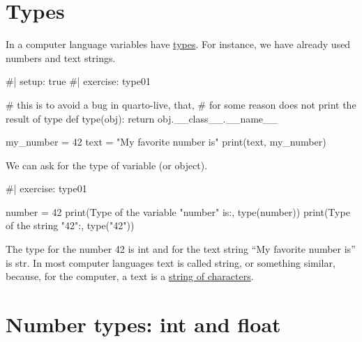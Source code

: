 \documentclass[
  letterpaper,
  DIV=11,
  numbers=noendperiod]{scrreprt}
\newenvironment{Shaded}{\begin{snugshade}}{\end{snugshade}}
\newcommand{\NormalTok}[1]{\textcolor[rgb]{0.00,0.23,0.31}{#1}}
\theoremstyle{remark}
\begin{document}
\section{Types}\label{types}

In a computer language variables have
\href{https://en.wikipedia.org/wiki/Data_type}{types}. For instance, we
have already used numbers and text strings.

\begin{Shaded}
\begin{Highlighting}[]
\NormalTok{\#| setup: true}
\NormalTok{\#| exercise: type01}

\NormalTok{\# this is to avoid a bug in quarto{-}live, that,}
\NormalTok{\# for some reason does not print the result of type}
\NormalTok{def type(obj):}
\NormalTok{    return obj.\_\_class\_\_.\_\_name\_\_}
\end{Highlighting}
\end{Shaded}

\begin{Shaded}
\begin{Highlighting}[]
\NormalTok{my\_number = 42}
\NormalTok{text = "My favorite number is"}
\NormalTok{print(text, my\_number)}
\end{Highlighting}
\end{Shaded}

We can ask for the type of variable (or object).

\begin{Shaded}
\begin{Highlighting}[]
\NormalTok{\#| exercise: type01}

\NormalTok{number = 42}
\NormalTok{print(\textquotesingle{}Type of the variable "number" is:\textquotesingle{}, type(number))}
\NormalTok{print(\textquotesingle{}Type of the string "42":\textquotesingle{}, type("42"))}
\end{Highlighting}
\end{Shaded}

The type for the number 42 is int and for the text string ``My favorite
number is'' is str. In most computer languages text is called string, or
something similar, because, for the computer, a text is a
\href{https://en.wikipedia.org/wiki/String_(computer_science)}{string of
characters}.

\section{Number types: int and float}\label{number-types-int-and-float}
\end{document}

